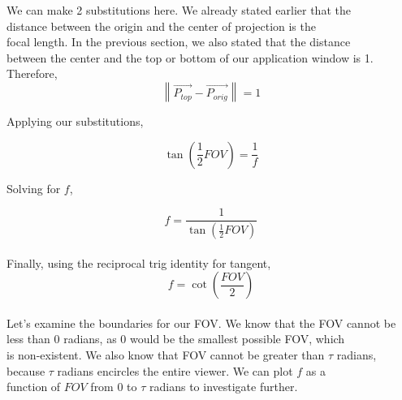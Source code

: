 \documentclass[11.pt]{article}
\begin{document}
We can make 2 substitutions here. We already stated earlier that the\\
distance between the origin and the center of projection is the\\
focal length. In the previous section, we also stated that the distance\\
between the center and the top or bottom of our application window is 1.\\
Therefore,\\

$$ \left\lVert \vec{P_{top}}-\vec{P_{orig}}  \right\rVert = 1$$

Applying our substitutions,

$$ \tan\left( \frac{1}{2}FOV \right)=\frac{1}{f} $$

Solving for $f$,

$$ f = \frac{1}{\tan\left( \frac{1}{2}FOV \right)} $$\\

Finally, using the reciprocal trig identity for tangent,\\

$$ f = \cot\left( \frac{FOV}{2} \right) $$\\

Let's examine the boundaries for our FOV. We know that the FOV cannot be\\
less than 0 radians, as 0 would be the smallest possible FOV, which\\
is non-existent. We also know that FOV cannot be greater than $\tau$ radians,\\
because $\tau$ radians encircles the entire viewer. We can plot $f$ as a\\
function of $FOV$ from 0 to $\tau$ radians to investigate further.\\

\end{document}
